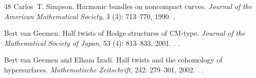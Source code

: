 \documentclass[11pt]{amsart}
\theoremstyle{definition}
\theoremstyle{remark}
\numberwithin{equation}{section}
\begin{document}
\begin{thebibliography}{48}
Carlos~T. Simpson.
\newblock Harmonic bundles on noncompact curves.
\newblock \emph{Journal of the American Mathematical Society}, 3
  (3): 713--770, 1990.
\newblock {}.

Bert van Geemen.
\newblock Half twists of {H}odge structures of {CM}-type.
\newblock \emph{Journal of the Mathematical Society of Japan}, 53
  (4): 813--833, 2001.
\newblock {}.
\newblock {}.

Bert van Geemen and Elham Izadi.
\newblock Half twists and the cohomology of hypersurfaces.
\newblock \emph{Mathematische Zeitschrift}, 242: 279--301, 2002.
\newblock {}.
\newblock {}.

\end{thebibliography}
\end{document}
